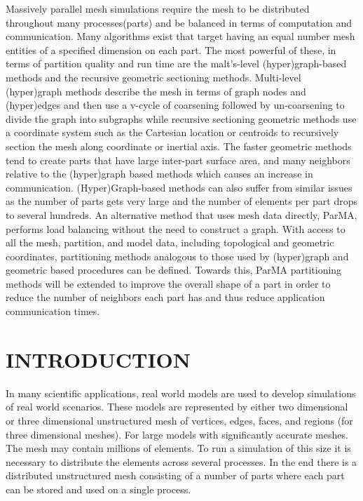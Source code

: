 \documentclass{thesis}
\author{Gerrett Diamond, Cameron Smith}
\begin{document}
 
\titlepage             %
\tableofcontents       %

Massively parallel mesh simulations require the mesh to be distributed
throughout many processes(parts) and be balanced in terms of computation and
communication. 
Many algorithms exist that target having an equal number mesh entities of a
specified dimension on each part. 
The most powerful of these, in terms of partition quality and run time are the
malt's-level (hyper)graph-based methods and the recursive geometric sectioning
methods. 
Multi-level (hyper)graph methods describe the mesh in terms of graph nodes and
(hyper)edges and then use a v-cycle of coarsening followed by un-coarsening to
divide the graph into subgraphs while recursive sectioning geometric methods use
a coordinate system such as the Cartesian location or centroids to recursively
section the mesh along coordinate or inertial axis. 
The faster geometric methods tend to create parts that have large inter-part
surface area, and many neighbors relative to the (hyper)graph based methods
which causes an increase in communication.
(Hyper)Graph-based methods can also suffer from similar issues as the number of
parts gets very large and the number of elements per part drops to several
hundreds. 
An alternative method that uses mesh data directly, ParMA, performs load 
balancing without the need to construct a graph. 
With access to all the mesh, partition, and model data, including topological 
and geometric coordinates, partitioning methods analogous to those used by 
(hyper)graph and geometric based procedures can be defined.
Towards this, ParMA partitioning methods will be extended to improve the 
overall shape of a part in order to reduce the number of neighbors each part 
has and thus reduce application communication times.

\newpage

\begingroup
\let\clearpage\relax

\chapter{INTRODUCTION}

In many scientific applications, real world models are used to develop simulations of real world scenarios. These models are represented by either two dimensional or three dimensional unstructured mesh of vertices, edges, faces, and regions (for three dimensional meshes). For large models with significantly accurate meshes. The mesh may contain millions of elements. To run a simulation of this size it is necessary to distribute the elements across several processes. In the end there is a distributed unstructured mesh consisting of a number of parts where each part can be stored and used on a single process. 
\end{document}
